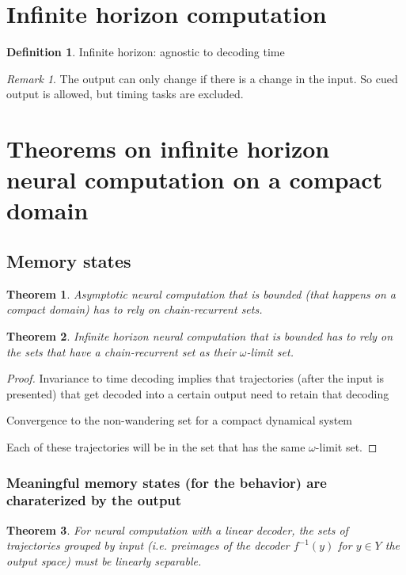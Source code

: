 \documentclass{scrartcl}
\newtheorem{theorem}{Theorem}
\theoremstyle{definition}
\newtheorem{definition}{Definition}
\theoremstyle{remark}
\newtheorem{remark}{Remark}
\begin{document}
\section{Infinite horizon computation}	
\begin{definition}
Infinite horizon: agnostic to decoding time
\end{definition}

\begin{remark}
The output can only change if there is a change in the input. 
So cued output is allowed, but timing tasks are excluded.
\end{remark}

\section{Theorems on infinite horizon neural computation on a compact domain}


\subsection{Memory states}%

\begin{theorem}
Asymptotic neural computation that is bounded (that happens on a compact domain) has to rely on chain-recurrent sets.
\end{theorem}

\begin{theorem}	
Infinite horizon neural computation that is bounded has to rely on the sets that have a chain-recurrent set as their $\omega$-limit set.
\end{theorem}	



\begin{proof}
Invariance to time decoding implies that trajectories (after the input is presented) that get decoded into a certain output need to retain that decoding

Convergence to the non-wandering set for a compact dynamical system \citep{conley1978}

Each of these trajectories will be in the set that has the same $\omega$-limit set.
\end{proof}


\subsubsection{Meaningful memory states (for the behavior) are charaterized by the output}
\begin{theorem}
For neural computation with a linear decoder, the sets of trajectories grouped by input (i.e. preimages of the decoder $f^{-1}(y)$ for $y\in Y$ the output space) must be linearly separable.
\end{theorem}
\end{document}
